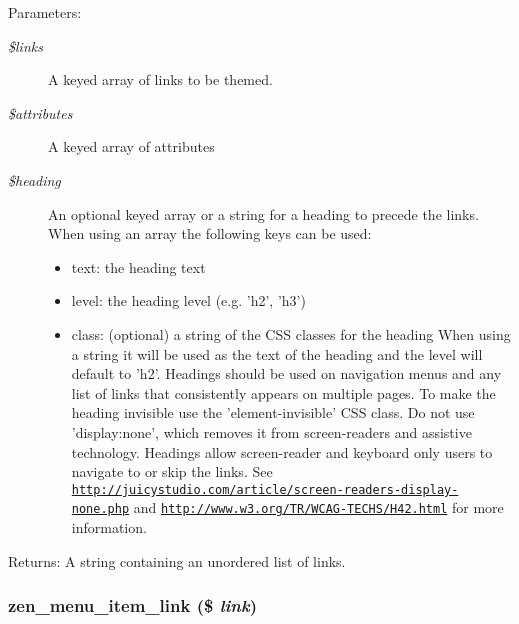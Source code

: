 \begin{Desc}
\item[Parameters:]
\begin{description}
\item[{\em \$links}]A keyed array of links to be themed. \item[{\em \$attributes}]A keyed array of attributes \item[{\em \$heading}]An optional keyed array or a string for a heading to precede the links. When using an array the following keys can be used:\begin{itemize}
\item text: the heading text\item level: the heading level (e.g. 'h2', 'h3')\item class: (optional) a string of the CSS classes for the heading When using a string it will be used as the text of the heading and the level will default to 'h2'. Headings should be used on navigation menus and any list of links that consistently appears on multiple pages. To make the heading invisible use the 'element-invisible' CSS class. Do not use 'display:none', which removes it from screen-readers and assistive technology. Headings allow screen-reader and keyboard only users to navigate to or skip the links. See \href{http://juicystudio.com/article/screen-readers-display-none.php}{\tt http://juicystudio.com/article/screen-readers-display-none.php} and \href{http://www.w3.org/TR/WCAG-TECHS/H42.html}{\tt http://www.w3.org/TR/WCAG-TECHS/H42.html} for more information. \end{itemize}
\end{description}
\end{Desc}
\begin{Desc}
\item[Returns:]A string containing an unordered list of links. \end{Desc}
\hypertarget{sites_2all_2themes_2zen_2template_8php_5cc3de9913eef914e51aff3c972c2e70}{
\subsubsection[{zen\_\-menu\_\-item\_\-link}]{\setlength{\rightskip}{0pt plus 5cm}zen\_\-menu\_\-item\_\-link (\$ {\em link})}}
\label{sites_2all_2themes_2zen_2template_8php_5cc3de9913eef914e51aff3c972c2e70}


